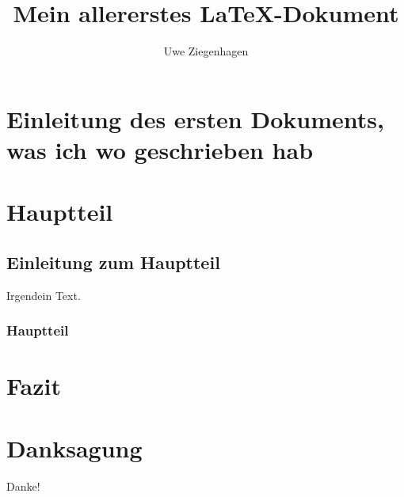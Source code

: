 \documentclass[12pt,ngerman]{scrartcl}
\author{Uwe Ziegenhagen}
\title{Mein allererstes \LaTeX-Dokument}
\begin{document}
\maketitle

\tableofcontents

\section{Einleitung des ersten Dokuments, was ich wo geschrieben hab}

\blindtext

\section{Hauptteil}

\subsection{Einleitung zum Hauptteil}

Irgendein Text.

\subsubsection{Hauptteil}


\blindtext[2]

\blindtext[2]


\section{Fazit}

\blindtext[100]


\section{Danksagung}

Danke!
\end{document}
